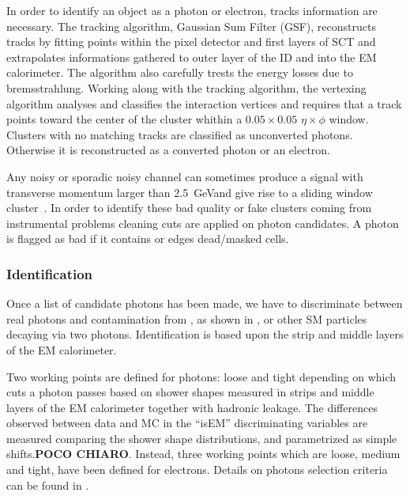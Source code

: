 In order to identify an object as a photon or electron, tracks information are necessary. The tracking algorithm, Gaussian Sum Filter (GSF), reconstructs tracks by fitting points within the pixel detector and first layers of SCT and extrapolates informations gathered to outer layer of the ID and into the EM calorimeter. The algorithm also carefully trests the energy losses due to bremsstrahlung. Working along with the tracking algorithm, the vertexing algorithm analyses and classifies the interaction vertices and requires that a track points toward the center of the cluster whithin a $0.05\times0.05$ $\eta\times\phi$ window. Clusters with no matching tracks are classified as unconverted photons. Otherwise it is reconstructed as a converted photon or an electron.

Any noisy or sporadic noisy channel can sometimes produce a signal with transverse momentum larger than \SI{2.5}{\GeV }and give rise to a sliding window cluster~\cite{photons}. In order to identify these bad quality or fake clusters coming from instrumental problems cleaning cuts are applied on photon candidates. A photon is flagged as bad if it contains or edges dead/masked cells.

\subsubsection{Identification}
Once a list of candidate photons has been made, we have to discriminate between real photons and contamination from \pizero, as shown in \Fig{\ref{pizerogamma}}, or other SM particles decaying via two photons. Identification is based upon the strip and middle layers of the EM calorimeter.

Two working points are defined for photons: loose and tight depending on which cuts a photon passes based on shower shapes measured in strips and middle layers of the EM calorimeter together with hadronic leakage. The differences observed between data and MC in the ``isEM'' discriminating variables are measured comparing the shower shape distributions, and parametrized as simple shifts.{\bfseries POCO CHIARO}. Instead, three working points which are loose, medium and tight, have been defined for electrons. Details on photons selection criteria can be found in \cite[Sect. 4]{photons}.

